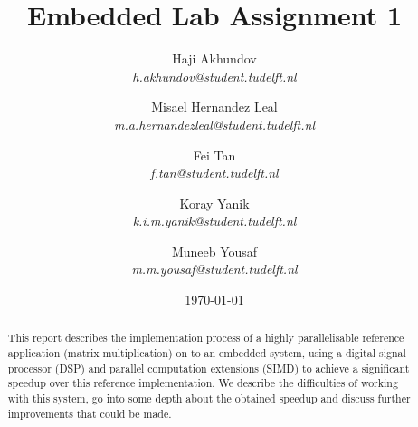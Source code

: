 \documentclass[a4paper,10pt]{article}
\title{Embedded Lab Assignment 1}
\author{
Haji Akhundov\\ \small{\textit{h.akhundov@student.tudelft.nl}} \and
Misael Hernandez Leal\\ \small{\textit{m.a.hernandezleal@student.tudelft.nl}} \and
Fei Tan\\ \small{\textit{f.tan@student.tudelft.nl}} \and
Koray Yanik\\ \small{\textit{k.i.m.yanik@student.tudelft.nl}} \and
Muneeb Yousaf\\ \small{\textit{m.m.yousaf@student.tudelft.nl}}
}
\date{\today}
\begin{document}
\maketitle

\nocite{*}

\begin{abstract}
This report describes the implementation process of a highly parallelisable 
reference application (matrix multiplication) on to an embedded system, using 
a digital signal processor (DSP) and parallel computation extensions (SIMD) to 
achieve a significant speedup over this reference implementation. We describe
the difficulties of working with this system, go into some depth about the 
obtained speedup and discuss further improvements that could be made.

\end{abstract}

\newpage
\tableofcontents















{}

\end{document}
